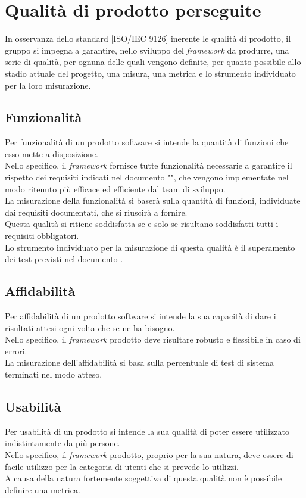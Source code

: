 
\section{Qualità di prodotto perseguite}
	In osservanza dello standard [ISO/IEC 9126] inerente le qualità di prodotto, il gruppo \groupname{} si impegna a garantire, nello sviluppo del \textit{framework} da produrre, una serie di qualità, per ognuna delle quali vengono definite, per quanto possibile allo stadio attuale del progetto, una misura, una metrica e lo strumento individuato per la loro misurazione.
	\subsection{Funzionalità}
		Per funzionalità di un prodotto software si intende la quantità di funzioni che esso mette a disposizione.\\
		Nello specifico, il \textit{framework} fornisce tutte funzionalità necessarie a garantire il rispetto dei requisiti indicati nel documento "", che vengono implementate nel modo ritenuto più efficace ed efficiente dal team di sviluppo.\\
		La misurazione della funzionalità si baserà sulla quantità di funzioni, individuate dai requisiti documentati, che si riuscirà a fornire.\\
		Questa qualità si ritiene soddisfatta se e solo se risultano soddisfatti tutti i requisiti obbligatori.\\
		Lo strumento individuato per la misurazione di questa qualità è il superamento dei test previsti nel documento .
	\subsection{Affidabilità}
		Per affidabilità di un prodotto software si intende la sua capacità di dare i risultati attesi ogni volta che se ne ha bisogno.\\
		Nello specifico, il \textit{framework} prodotto deve risultare robusto e flessibile in caso di errori.\\
		La misurazione dell'affidabilità si basa sulla percentuale di test di sistema terminati nel modo atteso.
	\subsection{Usabilità}
		Per usabilità di un prodotto si intende la sua qualità di poter essere utilizzato indistintamente da più persone.\\
		Nello specifico, il \textit{framework} prodotto, proprio per la sua natura, deve essere di facile utilizzo per la categoria di utenti che si prevede lo utilizzi.\\
		A causa della natura fortemente soggettiva di questa qualità non è possibile definire una metrica.
